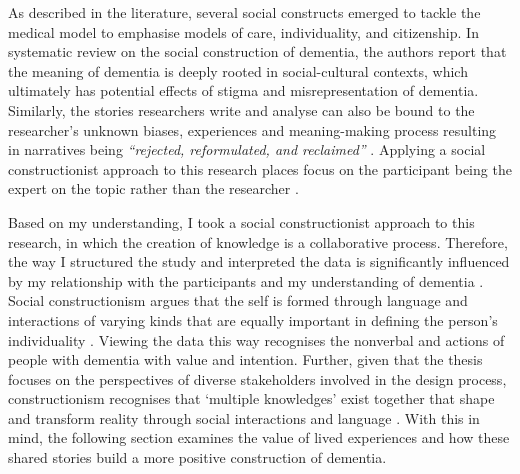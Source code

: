 As described in the literature, several social constructs emerged to tackle the medical model to emphasise models of care, individuality, and citizenship. In \cite{bosco2019social} systematic review on the social construction of dementia, the authors report that the meaning of dementia is deeply rooted in social-cultural contexts, which ultimately has potential effects of stigma and misrepresentation of dementia. Similarly, the stories researchers write and analyse can also be bound to the researcher's unknown biases, experiences and meaning-making process resulting in narratives being \textit{``rejected, reformulated, and reclaimed''} \citep[pg.850]{mcgovern2014forgotten}. Applying a social constructionist approach to this research places focus on the participant being the expert on the topic rather than the researcher \citep{padgett2016qualitative}.

Based on my understanding, I took a social constructionist approach to this research, in which the creation of knowledge is a collaborative process. Therefore, the way I structured the study and interpreted the data is significantly influenced by my relationship with the participants and my understanding of dementia \citep{surr2006preservation}. Social constructionism argues that the self is formed through language and interactions of varying kinds that are equally important in defining the person's individuality \citep{sarup1996identity}. Viewing the data this way recognises the nonverbal and actions of people with dementia with value and intention. Further, given that the thesis focuses on the perspectives of diverse stakeholders involved in the design process, constructionism recognises that `multiple knowledges' exist together that shape and transform reality through social interactions and language \citep{mckeown2015you}. With this in mind, the following section examines the value of lived experiences and how these shared stories build a more positive construction of dementia.

